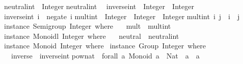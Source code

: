 \begin{isabellebody}
\begin{isamarkuptext}
{}{}\isanewline
\isanewline
neutral{}int\ {}{}\ Integer{}\isanewline
neutral{}int\ {}\ {}{}\isanewline
\isanewline
inverse{}int\ {}{}\ Integer\ {}{}\ Integer{}\isanewline
inverse{}int\ i\ {}\ negate\ i{}\isanewline
\isanewline
mult{}int\ {}{}\ Integer\ {}{}\ Integer\ {}{}\ Integer{}\isanewline
mult{}int\ i\ j\ {}\ i\ {}\ j{}\isanewline
\isanewline
instance\ Semigroup\ Integer\ where\ {}\isanewline
\ \ mult\ {}\ mult{}int{}\isanewline
{}{}\isanewline
\isanewline
instance\ Monoidl\ Integer\ where\ {}\isanewline
\ \ neutral\ {}\ neutral{}int{}\isanewline
{}{}\isanewline
\isanewline
instance\ Monoid\ Integer\ where\ {}\isanewline
{}{}\isanewline
\isanewline
instance\ Group\ Integer\ where\ {}\isanewline
\ \ inverse\ {}\ inverse{}int{}\isanewline
{}{}\isanewline
\isanewline
pow{}nat\ {}{}\ forall\ a{}\ {}Monoid\ a{}\ {}{}\ Nat\ {}{}\ a\ {}{}\ a{}\isanewline

\end{isamarkuptext}
\end{isabellebody}
